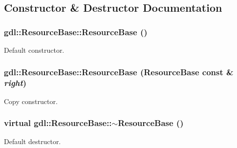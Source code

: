 \subsection{Constructor \& Destructor Documentation}
\hypertarget{classgdl_1_1ResourceBase_a0289636bcf3853381deb2325703d6d3d}{
\subsubsection[{ResourceBase}]{\setlength{\rightskip}{0pt plus 5cm}gdl::ResourceBase::ResourceBase ()}}
\label{classgdl_1_1ResourceBase_a0289636bcf3853381deb2325703d6d3d}
Default constructor. \hypertarget{classgdl_1_1ResourceBase_a8fc7453fe6219c010c42d31df1940e7e}{
\subsubsection[{ResourceBase}]{\setlength{\rightskip}{0pt plus 5cm}gdl::ResourceBase::ResourceBase ({\bf ResourceBase} const \& {\em right})}}
\label{classgdl_1_1ResourceBase_a8fc7453fe6219c010c42d31df1940e7e}
Copy constructor. \hypertarget{classgdl_1_1ResourceBase_afc2de70f0ca229deef3e5a5af1399736}{
\subsubsection[{$\sim$ResourceBase}]{\setlength{\rightskip}{0pt plus 5cm}virtual gdl::ResourceBase::$\sim$ResourceBase ()}}
\label{classgdl_1_1ResourceBase_afc2de70f0ca229deef3e5a5af1399736}
Default destructor. 

